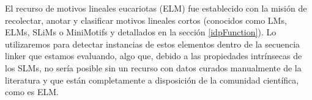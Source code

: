 El recurso de motivos lineales eucariotas (ELM) \cite{puntervoll2003elm,dinkel2013eukaryotic} fue establecido con la misión de recolectar, anotar y clasificar motivos lineales cortos 
(conocidos como LMs, ELMs, SLiMs o MiniMotifs y detallados en la sección \ref{idpFunction}). 
Lo utilizaremos para detectar instancias de estos elementos dentro de la secuencia linker que estamos evaluando, algo que, debido a las propiedades intrínsecas de los SLMs, no sería posible sin un recurso 
con datos curados manualmente de la literatura y que están completamente a disposición de la comunidad científica, como es ELM.


